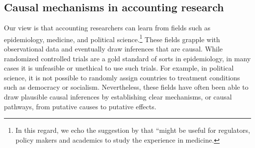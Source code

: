 \documentclass[12pt,reqno,titlepage]{amsart}
\theoremstyle{definition}
\begin{document}
\begin{doublespace}
\subsection{Causal mechanisms in accounting research}
Our view is that accounting researchers can learn from fields such as epidemiology, medicine, and political science.\footnote{In this regard, we echo the suggestion by \citet{Leuz:2015aa} that ``might be useful for regulators, policy makers and academics to study the experience in medicine.}
These fields grapple with observational data and eventually draw inferences that are causal. 
While randomized controlled trials are a gold standard of sorts in epidemiology, in many cases it is unfeasible or unethical to use such trials.
For example, in political science, it is not possible to randomly assign countries to treatment conditions such as democracy or socialism.
Nevertheless, these fields have often been able to draw plausible causal inferences by establishing clear mechanisms, or causal pathways, from putative causes to putative effects. 


\end{doublespace}
\end{document}
